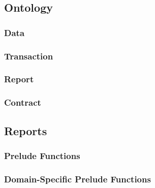 \subsection{Ontology}
\label{app:muerp-ontology}

\subsubsection{Data}
\label{app:muerp-ontology-data}


\subsubsection{Transaction}
\label{app:muerp-ontology-transaction}


\subsubsection{Report}
\label{app:muerp-ontology-report}


\subsubsection{Contract}
\label{app:muerp-ontology-contract}


\subsection{Reports}
\label{app:muerp-reports}



\subsubsection{Prelude Functions}
\label{app:muerp-reports-prelude}


\subsubsection{Domain-Specific Prelude Functions}
\label{app:muerp-reports-dsprelude}



